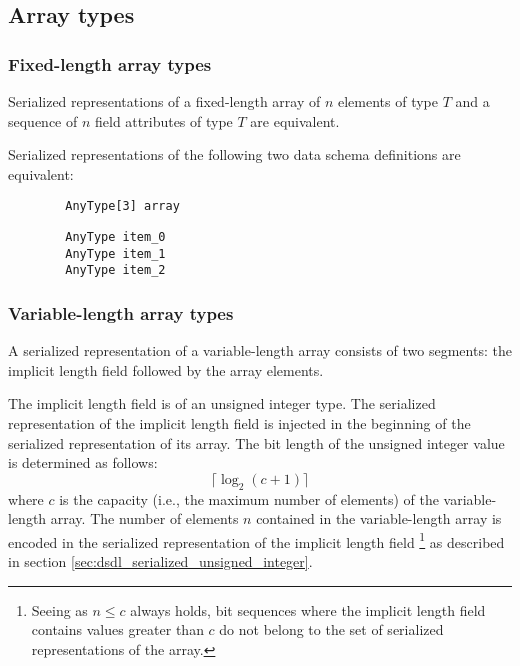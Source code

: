 \subsection{Array types}

\subsubsection{Fixed-length array types}

Serialized representations of a fixed-length array of $n$ elements of type $T$ and
a sequence of $n$ field attributes of type $T$ are equivalent.

\begin{remark}
    Serialized representations of the following two data schema definitions are equivalent:

    \begin{verbatim}
        AnyType[3] array
    \end{verbatim}

    \begin{verbatim}
        AnyType item_0
        AnyType item_1
        AnyType item_2
    \end{verbatim}
\end{remark}

\subsubsection{Variable-length array types}\label{sec:dsdl_serialized_variable_length_array}

A serialized representation of a variable-length array consists of two segments:
the implicit length field followed by the array elements.

The implicit length field is of an unsigned integer type.
The serialized representation of the implicit length field
is injected in the beginning of the serialized representation of its array.
The bit length of the unsigned integer value is determined as follows:
$$\lceil{}\log_2 (c + 1)\rceil{}$$
where $c$ is the capacity (i.e., the maximum number of elements) of the variable-length array.
The number of elements $n$ contained in the variable-length array is encoded
in the serialized representation of the implicit length field%
\footnote{%
    Seeing as $n \leq c$ always holds, bit sequences where the implicit length field contains values
    greater than $c$ do not belong to the set of serialized representations of the array.
}
as described in section \ref{sec:dsdl_serialized_unsigned_integer}.

